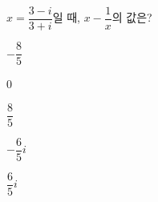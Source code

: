 $x=\dfrac{3-i}{3+i}$일 때, $x-\dfrac{1}{x}$의 값은?
\begin{choices32}{\rule[-3ex]{0pt}{8ex}$-\dfrac{8}{5}$}{\rule[-3ex]{0pt}{8ex}$0$}{\rule[-3ex]{0pt}{8ex}$\dfrac{8}{5}$}{\rule[-3ex]{0pt}{8ex}$-\dfrac{6}{5}i$}{\rule[-3ex]{0pt}{8ex}$\dfrac{6}{5}i$}\end{choices32}
